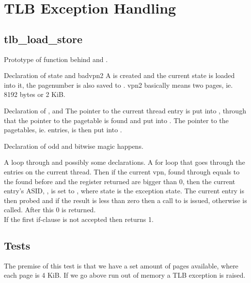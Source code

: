 %
%
%

\section{TLB Exception Handling}
\subsection{tlb\_load\_store}
    {Prototype of function behind  and
                          .}

    {Declaration of state and badvpn2}
A  is created and the current state is loaded
into it, the pagenumber is also saved to . vpn2
basically means two pages, ie. 8192 bytes or 2 KiB.


    {Declaration of ,  and }
The pointer to the current thread entry is put into , through
that the pointer to the pagetable is found and put into . The
pointer to the pagetables, ie. entries, is then put into .

    {Declaration of odd and bitwise magic happens.}

    {A loop through  and possibly some declarations.}
A for loop that goes through the entries on the current thread. Then if the
current vpn, found through  equals to the 
found before and the register returned are bigger than 0, then the current entry's ASID,
, is set to , where state is the
exception state. The current entry is then probed and if the result is less than
zero then a call to  is issued, otherwise
 is called. After this 0 is returned. \\
If the first if-clause is not accepted then 
returns 1.
\subsection{Tests}
The premise of this test is that we have a set amount of pages available, where
each page is 4 KiB. If we go above run out of memory a TLB exception is raised.
